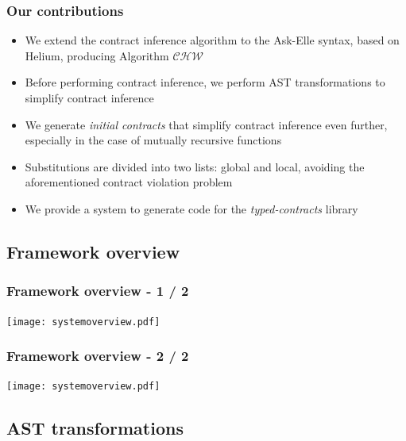 \documentclass[]{beamer}
\newcommand{\CHW}{$\mathcal{CHW}$}
\begin{document}
\begin{frame}[fragile]
\frametitle{Our contributions}

\begin{itemize}
	\item We extend the contract inference algorithm to the Ask-Elle syntax, based on Helium, producing Algorithm \CHW
	\item Before performing contract inference, we perform AST transformations to simplify contract inference
	\item We generate \textit{initial contracts} that simplify contract inference even further, especially in the case of mutually recursive functions
	\item Substitutions are divided into two lists: global and local, avoiding the aforementioned contract violation problem
	\item We provide a system to generate code for the \textit{typed-contracts} library
\end{itemize}

\end{frame}

\subsection{Framework overview}

\begin{frame}
\frametitle{Framework overview - 1 / 2}

\begin{center}
\texttt{[image: systemoverview.pdf]}
\end{center}

\end{frame}

\begin{frame}
\frametitle{Framework overview - 2 / 2}

\begin{center}
\texttt{[image: systemoverview.pdf]}
\end{center}

\end{frame}

\subsection{AST transformations}
\end{document}
